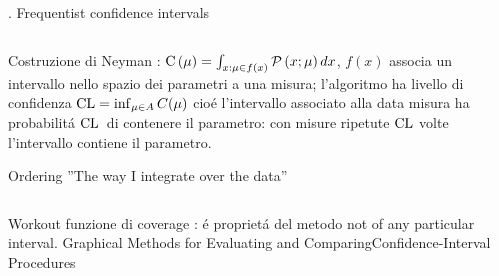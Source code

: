 \documentclass[asd-beamer.tex]{subfiles}%
\begin{document}
\begin{frame}{. Frequentist confidence intervals}
\begin{columns}[T]
\begin{column}{0.6\textwidth}
	\begin{block}{Costruzione di Neyman}
		: $\operatorname{C}{(\mu)}=\int_{x:\mu\in f(x)}\operatorname{\mathcal{P}}{(x;\mu)}\,dx$, $f(x)$ associa un intervallo nello spazio dei parametri a una misura; l'algoritmo ha livello di confidenza $\operatorname{CL}=\inf_{\mu\in A}C(\mu)$ cio\'e l'intervallo associato alla data misura ha probabilit\'a $\operatorname{CL}{}$ di contenere il parametro: con misure ripetute $\operatorname{CL}$ volte l'intervallo contiene il parametro.
	\end{block}
	\begin{block}{Ordering}
		''The way I integrate over the data''
	\end{block}
\end{column}
\end{columns}
\end{frame}

\begin{wordonframe}{Workout funzione di coverage}
: \'e propriet\'a del metodo not of any particular interval.
Graphical Methods for Evaluating and ComparingConfidence-Interval Procedures
\end{wordonframe}
\end{document}
